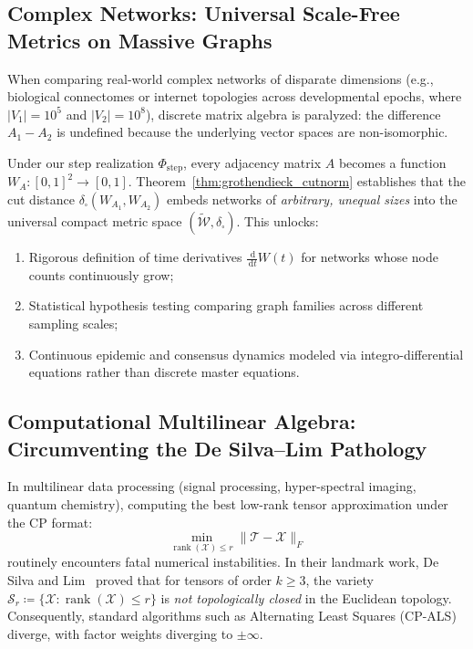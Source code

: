 \documentclass[11pt,a4paper,reqno]{amsart}
\theoremstyle{definition}
\numberwithin{equation}{section}
\newcommand{\rank}{\operatorname{rank}}
\newcommand{\dif}{\,\mathrm{d}}
\begin{document}
\subsection{Complex Networks: Universal Scale-Free Metrics on Massive Graphs}
\label{subsec:imp_networks}
When comparing real-world complex networks of disparate dimensions (e.g., biological connectomes or internet topologies across developmental epochs, where $|V_1| = 10^5$ and $|V_2| = 10^8$), discrete matrix algebra is paralyzed: the difference $A_1 - A_2$ is undefined because the underlying vector spaces are non-isomorphic.

Under our step realization $\Phi_{\mathrm{step}}$, every adjacency matrix $A$ becomes a function $W_A \colon [0, 1]^2 \to [0, 1]$. Theorem~\ref{thm:grothendieck_cutnorm} establishes that the cut distance $\delta_\square(W_{A_1}, W_{A_2})$ embeds networks of \emph{arbitrary, unequal sizes} into the universal compact metric space $(\widetilde{\mathcal{W}}, \delta_\square)$. This unlocks:
\begin{enumerate}[label=(\roman*)]
    \item Rigorous definition of time derivatives $\frac{\dif}{\dif t} W(t)$ for networks whose node counts continuously grow;
    \item Statistical hypothesis testing comparing graph families across different sampling scales;
    \item Continuous epidemic and consensus dynamics modeled via integro-differential equations rather than discrete master equations.
\end{enumerate}

\subsection{Computational Multilinear Algebra: Circumventing the De Silva--Lim Pathology}
\label{subsec:imp_tensors}
In multilinear data processing (signal processing, hyper-spectral imaging, quantum chemistry), computing the best low-rank tensor approximation under the CP format:
\begin{equation}
    \min_{\rank(\mathcal{X}) \le r} \|\mathcal{T} - \mathcal{X}\|_F
\end{equation}
routinely encounters fatal numerical instabilities. In their landmark work, De Silva and Lim~\cite{desilva2008illposed,lim2005singular} proved that for tensors of order $k \ge 3$, the variety $\mathcal{S}_r \coloneqq \{\mathcal{X} \colon \rank(\mathcal{X}) \le r\}$ is \emph{not topologically closed} in the Euclidean topology. Consequently, standard algorithms such as Alternating Least Squares (CP-ALS) diverge, with factor weights diverging to $\pm \infty$.
\end{document}
